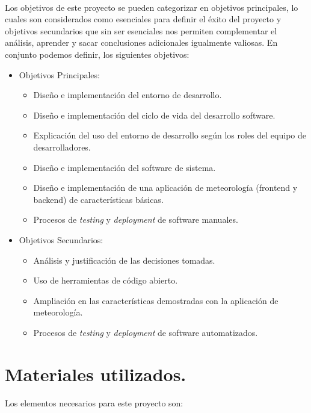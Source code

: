 \paragraph{} Los objetivos de este proyecto se pueden categorizar en objetivos principales,
lo cuales son considerados como esenciales para  definir el éxito del proyecto y
objetivos secundarios que sin ser esenciales nos permiten complementar el análisis,
aprender y sacar conclusiones adicionales igualmente valiosas. En conjunto podemos
definir, los siguientes objetivos:

\begin{itemize}
	\item Objetivos Principales:
	\begin{itemize}
		\item Diseño e implementación del entorno de desarrollo.
		\item Diseño e implementación del ciclo de vida del desarrollo software.
		\item Explicación del uso del entorno de desarrollo según los roles del equipo
		de desarrolladores.
		\item Diseño e implementación del software de sistema.
		\item Diseño e implementación de una aplicación de meteorología (frontend y backend)
		de características básicas.
		\item Procesos de \textit{testing} y \textit{deployment} de software manuales.
	\end{itemize}
	\item Objetivos Secundarios:
	\begin{itemize}
		\item Análisis y justificación de las decisiones tomadas.
		\item Uso de herramientas de código abierto.
		\item Ampliación en las características demostradas con la aplicación de
		meteorología.
		\item Procesos de \textit{testing} y \textit{deployment} de software automatizados.
	\end{itemize}
\end{itemize}


\section{Materiales utilizados.}

\paragraph{}Los elementos necesarios para este proyecto son:

